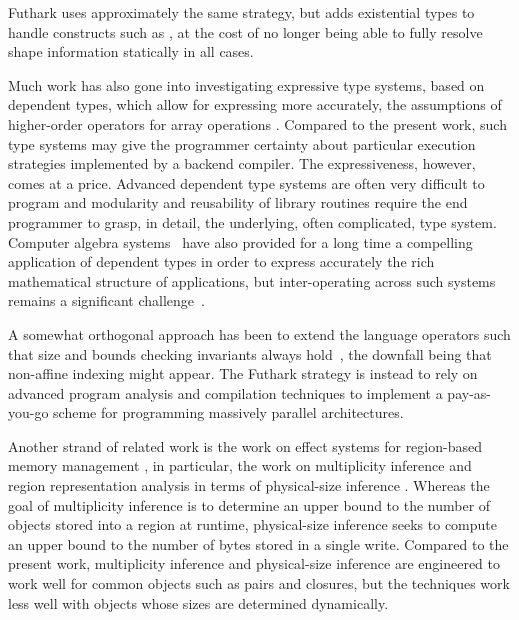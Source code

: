Futhark uses approximately the same strategy, but adds existential
types to handle constructs such as , at the cost of no
longer being able to fully resolve shape information statically in all
cases.

Much work has also gone into investigating expressive type systems,
based on dependent types, which allow for expressing more accurately,
the assumptions of higher-order operators for array operations
\cite{AgdaAccellerate,Trojahner:2008,Trojahner2009643}. Compared to
the present work, such type systems may give the programmer certainty
about particular execution strategies implemented by a backend
compiler. The expressiveness, however, comes at a price. Advanced
dependent type systems are often very difficult to program and
modularity and reusability of library routines require the end
programmer to grasp, in detail, the underlying, often complicated,
type system.  Computer algebra systems~\cite{AXIOM,AldorCAH} have also
provided for a long time a compelling application of dependent types
in order to express accurately the rich mathematical structure of
applications, but inter-operating across such systems remains a
significant challenge~\cite{mapal_synasc,alma:ISSAC}.

A somewhat orthogonal approach has been to extend the language
operators such that size and bounds checking invariants always
hold~\cite{ElsmanDybdal:Array:2014}, the downfall being that
non-affine indexing might appear.  The Futhark strategy is instead to
rely on advanced program analysis and compilation techniques to
implement a pay-as-you-go scheme for programming massively parallel
architectures.

Another strand of related work is the work on effect systems for
region-based memory management \cite{mlkit_retrospective}, in
particular, the work on multiplicity inference and region
representation analysis in terms of physical-size inference
\cite{vejlstrup94,btv96}. Whereas the goal of multiplicity inference
is to determine an upper bound to the number of objects stored into a
region at runtime, physical-size inference seeks to compute an upper
bound to the number of bytes stored in a single write. Compared to the
present work, multiplicity inference and physical-size inference are
engineered to work well for common objects such as pairs and closures,
but the techniques work less well with objects whose sizes are
determined dynamically.


